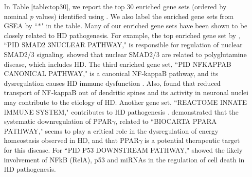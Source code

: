 	In Table \ref{table:top30}, we report the top 30 enriched gene sets (ordered by nominal $p$ 
	values) identified using \OurMethod. We also label the enriched gene sets from GSEA by 
	``$\ast$" in the table. Many of our enriched gene sets have been shown to be closely related to 
	HD pathogenesis. For example, the top enriched gene set by \OurMethod, ``PID SMAD2 3NUCLEAR 
	PATHWAY," is responsible for regulation of nuclear SMAD2/3 signaling. 
	\citet{katsuno2010disrupted} showed that nuclear SMAD2/3 are
	related to polyglutamine disease, which includes HD. The third enriched gene set, ``PID NFKAPPAB
	CANONICAL PATHWAY," is a canonical NF-kappaB pathway, and its dysregulation causes HD immune
	dysfunction \citep{trager2014htt}. Also, \citet{marcora2010huntington} found that reduced 
	transport of NF-kappaB out of dendritic spines and its activity in neuronal nuclei may 
	contribute to the etiology of HD. 
	Another gene set, ``REACTOME INNATE IMMUNE SYSTEM," contributes to HD pathogenesis
	\citep{labadorf2015rna,trager2014htt}. %
	\citet{chiang2010modulation} demonstrated that the systematic downregulation of PPAR$\gamma$,
	related to ``BIOCARTA PPARA PATHWAY," seems to play a critical role in the dysregulation of 
	energy homeostasis observed in HD, and that PPAR$\gamma$ is a potential therapeutic target for 
	this disease. %
	For ``PID P53 DOWNSTREAM PATHWAY," \citet{ghose2011regulation} showed the likely involvement of 
	NFkB (RelA), p53 and miRNAs in the regulation of cell death in HD pathogenesis. 
	

